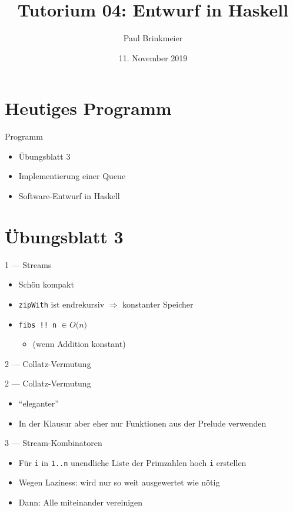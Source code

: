 \documentclass{beamer}
\title{Tutorium 04: Entwurf in Haskell}
\author{Paul Brinkmeier}
\institute{Tutorium Programmierparadigmen am KIT}
\date{11. November 2019}
\newcommand{\code}[1]{
	\begin{mdframed}
		
	\end{mdframed}
}
\begin{document}
\begin{frame}
	\titlepage
\end{frame}

\section{Heutiges Programm}
\begin{frame}{Programm}
	\begin{itemize}
		\item Übungsblatt 3
		\item Implementierung einer Queue
		\item Software-Entwurf in Haskell
	\end{itemize}
\end{frame}

\section{Übungsblatt 3}

\begin{frame}{1 --- Streams}
	\code{demos/Fibs.hs}

	\begin{itemize}
		\item Schön kompakt
		\item \texttt{zipWith} ist endrekursiv $\Rightarrow$ konstanter Speicher
		\item \texttt{fibs !! n} $\in O($\pause$n)$
		\begin{itemize}
			\item (wenn Addition konstant)
		\end{itemize}
	\end{itemize}
\end{frame}

\begin{frame}{2 --- Collatz-Vermutung}
	\code{demos/Collatz.hs}
\end{frame}

\begin{frame}{2 --- Collatz-Vermutung}
	\code{demos/CollatzAlt.hs}

	\begin{itemize}
		\item \enquote{eleganter}
		\item In der Klausur aber eher nur Funktionen aus der Prelude verwenden
	\end{itemize}
\end{frame}

\begin{frame}{3 --- Stream-Kombinatoren}
	\code{demos/Merge.hs}

	\begin{itemize}
		\item Für \texttt{i} in \texttt{1..n} unendliche Liste der Primzahlen hoch \texttt{i} erstellen
		\item Wegen Laziness: wird nur so weit ausgewertet wie nötig
		\item Dann: Alle miteinander vereinigen
	\end{itemize}
\end{frame}
\end{document}
